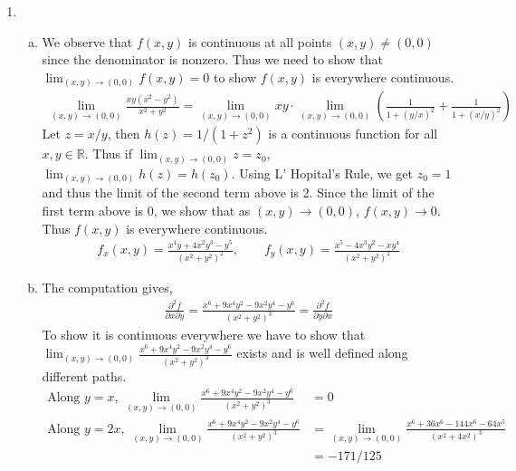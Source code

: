 \documentclass[a4paper,12pt]{article}
\theoremstyle{definition}
\begin{document}
\begin{enumerate}
\item
\begin{enumerate}[(a)]
\item We observe that $f(x,y)$ is continuous at all points $(x,y) \neq (0,0)$ since the denominator is nonzero. Thus we need to show that $\lim_{(x,y) \to (0,0)}f(x,y)=0$ to show $f(x,y)$ is everywhere continuous.
\begin{align*}
\lim_{(x,y) \to (0,0)}\frac{xy(x^2-y^2)}{x^2+y^2} = \lim_{(x,y) \to (0,0)}xy\cdot \lim_{(x,y) \to (0,0)}\left(\frac{1}{1+(y/x)^2}+\frac{1}{1+(x/y)^2}\right)
\end{align*}
Let $z = x/y$, then $h(z) = 1/(1+z^2)$ is a continuous function for all $x,y \in \mathbb{R}$. Thus if $\lim_{(x,y) \to (0,0)}z = z_0$, $\lim_{(x,y) \to (0,0)}h(z) = h(z_0)$. Using L' Hopital's Rule, we get $z_0=1$ and thus the limit of the second term above is 2. Since the limit of the first term above is 0, we show that as $(x,y)\to (0,0)$, $f(x,y)\to 0$. Thus $f(x,y)$ is everywhere continuous.
\begin{align*}
f_x(x,y) = \frac{x^4y+4x^2y^3-y^5}{(x^2+y^2)^2},\qquad f_y(x,y) = \frac{x^5-4x^3y^2-xy^4}{(x^2+y^2)^2}
\end{align*}
\item The computation gives,
\begin{align*}
\frac{\partial^2f}{\partial x \partial y} = \frac{x^6+9x^4y^2-9x^2y^4-y^6}{(x^2+y^2)^3} = \frac{\partial^2f}{\partial y \partial x}
\end{align*}
To show it is continuous everywhere we have to show that $\lim_{(x,y)\to(0,0)}\frac{x^6+9x^4y^2-9x^2y^4-y^6}{(x^2+y^2)^3}$ exists and is well defined along different paths.
\begin{align*}
\text{Along $y=x$, }\lim_{(x,y)\to(0,0)}\frac{x^6+9x^4y^2-9x^2y^4-y^6}{(x^2+y^2)^3} &= 0\\
\text{Along $y=2x$, } \lim_{(x,y)\to(0,0)}\frac{x^6+9x^4y^2-9x^2y^4-y^6}{(x^2+y^2)^3}&= \lim_{(x,y)\to(0,0)}\frac{x^6+36x^6-144x^6-64x^5}{(x^2+4x^2)^3} \\
&=-171/125
\end{align*}
\end{enumerate}


\end{enumerate}
\end{document}
